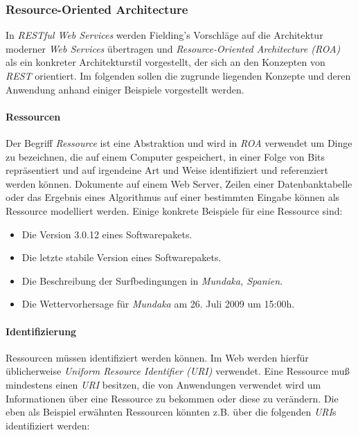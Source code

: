\subsubsection{Resource-Oriented Architecture}

In \textit{RESTful Web Services} \cite{Richardson07} werden Fielding's
Vorschläge auf die Architektur moderner \textit{Web Services}
übertragen und \textit{Resource-Oriented Architecture (ROA)} als ein
konkreter Architekturstil vorgestellt, der sich an den Konzepten von
\textit{REST} orientiert. Im folgenden sollen die zugrunde liegenden
Konzepte und deren Anwendung anhand einiger Beispiele vorgestellt
werden.

\paragraph{Ressourcen}

Der Begriff \textit{Ressource} ist eine Abstraktion und wird in
\textit{ROA} verwendet um Dinge zu bezeichnen, die auf einem Computer
gespeichert, in einer Folge von Bits repräsentiert und auf irgendeine
Art und Weise identifiziert und referenziert werden können. Dokumente
auf einem Web Server, Zeilen einer Datenbanktabelle oder das Ergebnis
eines Algorithmus auf einer bestimmten Eingabe können als Ressource
modelliert werden. Einige konkrete Beispiele für eine Ressource sind:

\begin{itemize}
\item Die Version 3.0.12 eines Softwarepakets.
\item Die letzte stabile Version eines Softwarepakets.
\item Die Beschreibung der Surfbedingungen in \textit{Mundaka,
    Spanien}.
\item Die Wettervorhersage für \textit{Mundaka} am 26. Juli 2009 um 15:00h.
\end{itemize}

\paragraph{Identifizierung}
Ressourcen müssen identifiziert werden können. Im Web werden hierfür
üblicherweise \textit{Uniform Resource Identifier (URI)}
 verwendet. Eine
Ressource muß mindestens einen \textit{URI} besitzen, die von
Anwendungen verwendet wird um Informationen über eine Ressource zu
bekommen oder diese zu verändern. Die eben als Beispiel erwähnten
Ressourcen könnten z.B. über die folgenden \textit{URI}s identifiziert
werden:

